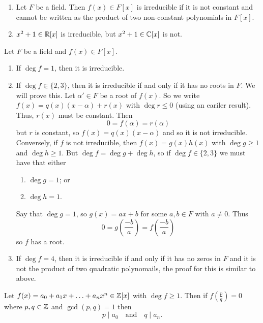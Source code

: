 \begin{example}
    \begin{enumerate}
        \item Let $F$ be a field. Then $f(x) \in F[x]$ is irreducible if it is not constant and cannot be written as the product of two non-constant polynomials in $F[x]$.

        \item $x^2 + 1 \in \mathbb{R}[x]$ is irreducible, but $x^2 + 1 \in \mathbb{C}[x]$ is not.
    \end{enumerate}
\end{example}

\begin{example}
    Let $F$ be a field and $f(x) \in F[x]$.
    \begin{enumerate}
        \item If $\deg{f} = 1$, then it is irreducible.
        \item If $\deg{f} \in \{2, 3\}$, then it is irreducible if and only if it has no roots in $F$. 
            We will prove this. 
            Let $\alpha '\in F$ be a root of $f(x)$. 
            So we write $f(x) = q(x)(x - \alpha) + r(x)$ with $\deg{r} \leq 0$ (using an eariler result).
            Thus, $r(x)$ must be constant.
            Then
            \[ 0 = f(\alpha) = r(\alpha) \]
            but $r$ is constant, so $f(x) = q(x)(x - \alpha)$ and so it is not irreducible.
            Conversely, if $f$ is not irreducible, then $f(x) = g(x) h(x)$ with $\deg{g} \geq 1$ and $\deg{h} \geq 1$.
            But $\deg{f} = \deg{g} + \deg{h}$, so if $\deg{f} \in \{2, 3\}$ we must have that either
            \begin{enumerate}
                \item $\deg{g} = 1$; or
                \item $\deg{h} = 1$.
            \end{enumerate}
            Say that $\deg{g} = 1$, so $g(x) = ax + b$ for some $a, b \in F$ with $a \neq 0$. Thus
            \[ 0 = g\left(\frac{-b}{a}\right) = f\left(\frac{-b}{a}\right) \]
            so $f$ has a root.
        \item If $\deg{f} = 4$, then it is irreducible if and only if it has no zeros in $F$ and it is not the product of two quadratic polynomails, the proof for this is similar to above.
    \end{enumerate}
\end{example}

\begin{proposition}[]
    Let $f(x) = a_0 + a_1x + \ldots + a_n x^n \in \mathbb{Z}[x]$ with $\deg{f} \geq 1$. Then if $f\left(\frac pq\right) = 0$ where $p, q \in \mathbb{Z}$ and $\gcd{(p, q)} = 1$ then
    \[ p \mid a_0 \quad \text{and} \quad q \mid a_n. \]
\end{proposition}

